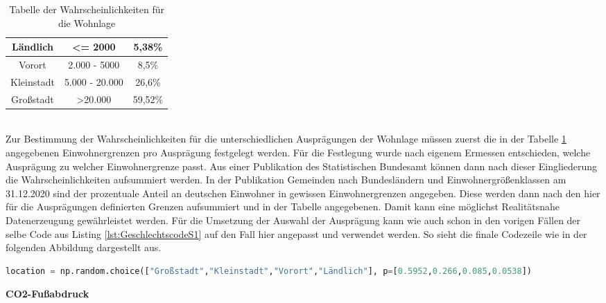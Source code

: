 \begin{onehalfspace}
\begin{table}[!h]
\begin{tabular}{|c|c|c|}
    Ländlich              & \textless{}= 2000        & 5,38\%                      \\ \hline
    Vorort                & 2.000 - 5000             & 8,5\%                       \\ \hline
    Kleinstadt            & 5.000 - 20.000           & 26,6\%                      \\ \hline
    Großstadt             & \textgreater 20.000      & 59,52\%                     \\ \hline
    \end{tabular}
    \caption{Tabelle der Wahrscheinlichkeiten für die Wohnlage}
    \label{table:10}
\end{table}\\
Zur Bestimmung der Wahrscheinlichkeiten für die unterschiedlichen Ausprägungen der Wohnlage müssen zuerst die in der Tabelle \ref{table:10} angegebenen Einwohnergrenzen pro Ausprägung festgelegt werden. Für die Festlegung wurde nach eigenem Ermessen entschieden, welche Ausprägung zu welcher Einwohnergrenze passt. Aus einer Publikation des Statistischen Bundesamt können dann nach dieser Eingliederung die Wahrscheinlichkeiten aufsummiert werden. In der Publikation \glqq{}Gemeinden nach Bundesländern und Einwohnergrößenklassen am 31.12.2020\grqq{} sind der prozentuale Anteil an deutschen Einwohner in gewissen Einwohnergrenzen angegeben. Diese werden dann nach den hier für die Ausprägungen definierten Grenzen aufsummiert und in der Tabelle angegebenen. Damit kann eine möglichst Realitätsnahe Datenerzeugung gewährleistet werden. Für die Umsetzung der Auswahl der Ausprägung kann wie auch schon in den vorigen Fällen der selbe Code aus Listing \ref{lst:GeschlechtscodeS1} auf den Fall hier angepasst und verwendet werden. So sieht die finale Codezeile wie in der folgenden Abbildung dargestellt aus.
\begin{lstlisting}[language=Python,label={lst:Sz2AuswahlWohnlage},caption=Codezeile zur Auswahl der Ausprägung der Wohnlage basierend auf angegebenen Wahrscheinlichkeiten]
location = np.random.choice(["Großstadt","Kleinstadt","Vorort","Ländlich"], p=[0.5952,0.266,0.085,0.0538])
\end{lstlisting}
\textbf{CO2-Fußabdruck}\\

\end{onehalfspace}
